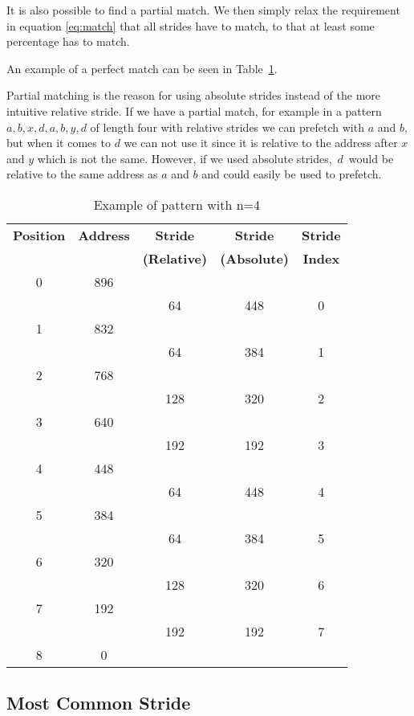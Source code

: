 It is also possible to find a partial match. We then simply relax the
requirement in equation \eqref{eq:match} that all strides have to match, to
that at least some percentage has to match.

An example of a perfect match can be seen in Table~\ref{table:pattern}.

Partial matching is the reason for using absolute strides instead of the more
intuitive relative stride. If we have a partial match, for example in a pattern
$a, b, x, d, a, b, y, d$ of length four with relative strides we can prefetch
with $a$ and $b$, but when it comes to $d$ we can not use it since it is
relative to the address after $x$ and $y$ which is not the same. However, if we
used absolute strides,~$d$~would be relative to the same address as $a$ and $b$
and could easily be used to prefetch.

\begin{table}[htb]
	\caption{Example of pattern with n=4}
	\label{table:pattern}
	\centering
	\begin{tabular}{c|c|c|c|c}
		\bfseries Position &
		\bfseries Address &
		\bfseries Stride &
		\bfseries Stride &
		\bfseries Stride \\
		& &
		\bfseries (Relative) &
		\bfseries (Absolute) &
		\bfseries Index \\
		\hline
		0 & 896   & & \\
		  &	& 64 & 448 & 0 \\
		1 & 832  & & \\
		  & & 64 & 384 & 1 \\
		2 & 768 & & \\
		  & & 128 & 320 & 2 \\
		3 & 640 & & \\
		  & & 192 & 192 & 3 \\
		4 & 448 & & \\
		  &	& 64 & 448 & 4 \\
		5 & 384 & & \\
		  &	& 64 & 384 & 5 \\
		6 & 320 & & \\
		  &	& 128 & 320 & 6 \\
		7 & 192 & & \\
		  &	& 192 & 192 & 7 \\
		8 & 0 & & \\
	\end{tabular}
\end{table}

\subsection{Most Common Stride}

